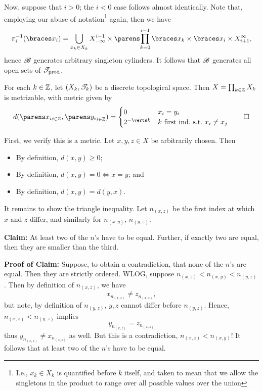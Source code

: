 \documentclass{fkpaper}
\begin{document}
\begin{multicols}{2}
\begin{sproof}
    Now, suppose that $i > 0$; the $i < 0$ case follows almost
    identically. Note that, employing our abuse of
    notation\footnote{I.e., $x_k \in X_k$ is quantified before $k$
      itself, and taken to mean that we allow the singletons in the
      product to range over all possible values over the union} again,
    then we have
    \[
      \pi_{i}^{-1}(\set{x_i}) = \bigcup_{x_k \in X_k} X_{-\infty}^{i -
        1} \times \pn{\prod_{k=0}^{i-1} \set{x_k}} \times \set{x_i}
      \times X_{i+1}^{\infty},
    \]
    hence ${\mathscr{B}}$ generates arbitrary singleton cylinders. It follows
    that ${\mathscr{B}}$ generates all open sets of ${\mathscr{T}}_{\rm prod}$.
  \end{sproof}



  \begin{proposition}\label{prop:product-metrizable}%
    For each $k \in \mathbb{Z}$, let $(X_k, {\mathscr{T}}_k)$ be a discrete topological
    space. Then $X = \prod_{k\in\mathbb{Z}} X_k$ is metrizable, with metric
    given by
    \[
      d(\pn{x_i}_{i \in \ZZ}, \pn{y_i}_{i \in \ZZ}) =
      \begin{cases}
        0 & x_i = y_i \\
        2^{-\abs{k}} & k \textnormal{ first ind.\ s.t.\ } x_i \neq x_j
      \end{cases} \qedhere
    \]
  \end{proposition}
  \begin{sproof}
    First, we verify this is a metric. Let $x,y,z \in X$ be arbitrarily
    chosen. Then
    \begin{itemize}
      \item By definition, $d(x,y) \geq 0$;
      \item By definition, $d(x,y) = 0 \iff x = y$; and
      \item By definition, $d(x,y) = d(y,x)$.
    \end{itemize}
    It remains to show the triangle inequality. Let $n_{(x,z)}$ be the
    first index at which $x$ and $z$ differ, and similarly for
    $n_{(x,y)}$, $n_{(y,z)}$.

    \noindent \textbf{Claim:} At least two of the $n$'s have to be
    equal. Further, if exactly two are equal, then they are smaller than
    the third.

    \noindent \textbf{Proof of Claim:} Suppose, to obtain a
    contradiction, that none of the $n$'s are equal. Then they are
    strictly ordered. WLOG, suppose $n_{(x,z)} < n_{(x,y)} < n_{(y,z)}$.
    Then by definition of $n_{(x,z)}$, we have
    \[
      x_{n_{(x,z)}} \neq z_{n_{(x,z)}},
    \]
    but note, by definition of $n_{(y,z)}$, $y,z$ cannot differ before
    $n_{(y,z)}$. Hence, $n_{(x,z)} < n_{(y,z)}$ implies
    \[
      y_{n_{(x,z)}} = z_{n_{(x,z)}}
    \]
    thus $y_{n_{(x,z)}} \neq x_{n_{(x,z)}}$ as well. But this is a
    contradiction, $n_{(x,z)} < n_{(x,y)}$! It follows that at least two
    of the $n$'s have to be equal.


\end{sproof}
\end{multicols}
\end{document}
